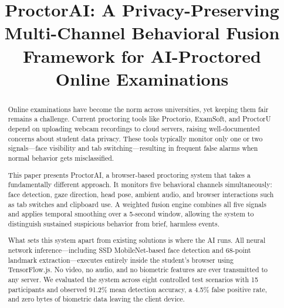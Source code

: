 \documentclass[conference]{IEEEtran}
\begin{document}
\title{ProctorAI: A Privacy-Preserving Multi-Channel Behavioral Fusion Framework for AI-Proctored Online Examinations}

\author{
    \and
}

\maketitle

\begin{abstract}
Online examinations have become the norm across universities, yet keeping them fair remains a challenge. Current proctoring tools like Proctorio, ExamSoft, and ProctorU depend on uploading webcam recordings to cloud servers, raising well-documented concerns about student data privacy. These tools typically monitor only one or two signals---face visibility and tab switching---resulting in frequent false alarms when normal behavior gets misclassified.

This paper presents ProctorAI, a browser-based proctoring system that takes a fundamentally different approach. It monitors five behavioral channels simultaneously: face detection, gaze direction, head pose, ambient audio, and browser interactions such as tab switches and clipboard use. A weighted fusion engine combines all five signals and applies temporal smoothing over a 5-second window, allowing the system to distinguish sustained suspicious behavior from brief, harmless events.

What sets this system apart from existing solutions is where the AI runs. All neural network inference---including SSD MobileNet-based face detection and 68-point landmark extraction---executes entirely inside the student's browser using TensorFlow.js. No video, no audio, and no biometric features are ever transmitted to any server. We evaluated the system across eight controlled test scenarios with 15 participants and observed 91.2\% mean detection accuracy, a 4.5\% false positive rate, and zero bytes of biometric data leaving the client device.
\end{abstract}
\end{document}
